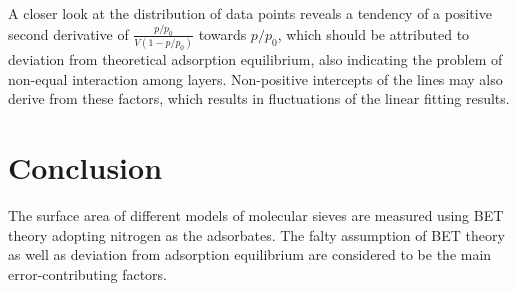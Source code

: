 \documentclass[%
 reprint,
 amsmath,amssymb,
 aps,
10.5pt,
]{revtex4-1}
\begin{document}
A closer look at the distribution of data points reveals a tendency of a positive second derivative of $\frac{p/p_0}{V(1-p/p_0)}$ towards $p/p_0$, which should be attributed to deviation from theoretical adsorption equilibrium, also indicating the problem of non-equal interaction among layers. Non-positive intercepts of the lines may also derive from these factors, which results in fluctuations of the linear fitting results.

\section{Conclusion}
The surface area of different models of molecular sieves are measured using BET theory adopting nitrogen as the adsorbates. The falty assumption of BET theory as well as deviation from adsorption equilibrium are considered to be the main error-contributing factors.
 





\end{document}
